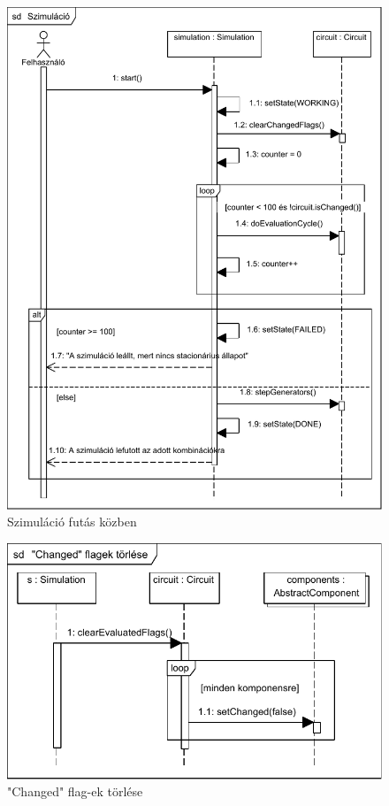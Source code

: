 \begin{figure}[H]
\begin{center}
\includegraphics{chapters/chapter04/seqdiagrams/felhasznalo_szimulacio.pdf}
\caption{Szimuláció futás közben}
\label{fig:user_sim}
\end{center}
\end{figure}

\begin{figure}[H]
\begin{center}
\includegraphics{chapters/chapter04/seqdiagrams/clear_changed_flags.pdf}
\caption{"Changed" flag-ek törlése}
\label{fig:clear_changed_flags}
\end{center}
\end{figure}

